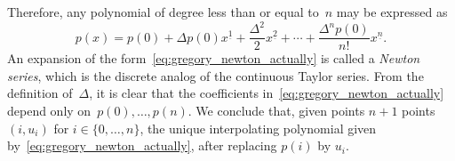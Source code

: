 Therefore, any polynomial of degree less than or equal to~$n$ may be expressed as
\begin{equation}
    \label{eq:gregory_newton_actually}
    p(x) = p(0) + \Delta p(0) x^{\underline{1}} + \frac{\Delta^2}{2} x^{\underline{2}} + \dotsb + \frac{\Delta^n p(0)}{n!} x^{\underline{n}}.
\end{equation}
An expansion of the form~\eqref{eq:gregory_newton_actually} is called a \emph{Newton series},
which is the discrete analog of the continuous Taylor series.
From the definition of~$\Delta$,
it is clear that the coefficients in~\eqref{eq:gregory_newton_actually} depend only on~$p(0), \dotsc, p(n)$.
We conclude that, given points $n+1$ points $(i, u_i)$ for $i \in \{0, \dotsc, n\}$,
the unique interpolating polynomial given by~\eqref{eq:gregory_newton_actually},
after replacing $p(i)$ by $u_i$.

